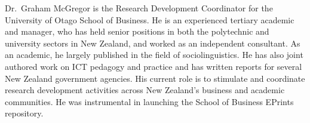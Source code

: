 \documentclass[12pt,pdftex,a4paper,titlepage]{article}
\begin{document}
Dr.\ Graham McGregor is the Research Development Coordinator for the University of Otago School of Business. He is an experienced tertiary academic and manager, who has held senior positions in both the polytechnic and university sectors in New Zealand, and worked as an independent consultant. As an academic, he largely published in the field of sociolinguistics. He has also joint authored work on ICT pedagogy and practice and has written reports for several New Zealand government agencies. His current role is to stimulate and coordinate research development activities across New Zealand's business and academic communities. He was instrumental in launching the School of Business EPrints repository.
\end{document}
